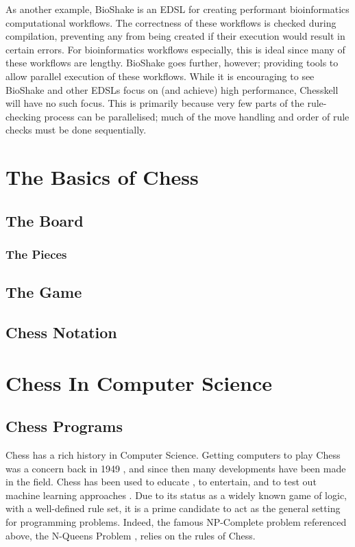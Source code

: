 \documentclass[12pt, a4paper, bibliography=totocnumbered]{scrreprt}
\begin{document}
As another example, BioShake \cite{bioshake} is an EDSL for creating performant bioinformatics computational workflows. The correctness of these workflows is checked during compilation, preventing any from being created if their execution would result in certain errors. For bioinformatics workflows especially, this is ideal since many of these workflows are lengthy. BioShake goes further, however; providing tools to allow parallel execution of these workflows. While it is encouraging to see BioShake and other EDSLs \cite{aplite} focus on (and achieve) high performance, Chesskell will have no such focus. This is primarily because very few parts of the rule-checking process can be parallelised; much of the move handling and order of rule checks must be done sequentially.

\chapter{The Basics of Chess}

\section{The Board}

\subsection{The Pieces}

\section{The Game}

\section{Chess Notation}

\chapter{Chess In Computer Science}

\section{Chess Programs}

Chess has a rich history in Computer Science. Getting computers to play Chess was a concern back in 1949 \cite{1949chess}, and since then many developments have been made in the field. Chess has been used to educate \cite{chesseducation}, to entertain, and to test out machine learning approaches \cite{chessml}. Due to its status as a widely known game of logic, with a well-defined rule set, it is a prime candidate to act as the general setting for programming problems. Indeed, the famous NP-Complete problem referenced above, the N-Queens Problem \cite{nqueensnp}, relies on the rules of Chess.
\end{document}
